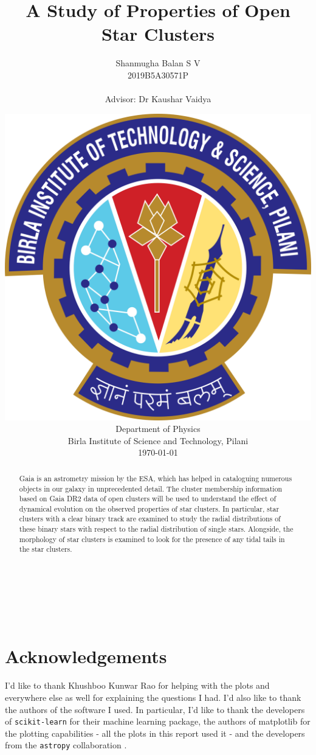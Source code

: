 \documentclass[12pt,a4paper,oneside,openright]{report}
\title{A Study of Properties of Open Star Clusters}
\author{Shanmugha Balan S V \\ 2019B5A30571P \\[1cm]\\{\small Advisor: Dr Kaushar Vaidya}\\[1cm]}
\date{\includegraphics[scale=0.1]{logo} \\ Department of Physics\\ Birla Institute of Science and Technology, Pilani\\[5mm] \today}
\begin{document}
\pagestyle{empty}

\maketitle	
\cleardoublepage

\newpage 
\ %
\newpage

\singlespacing
{}
\pagestyle{plain}
	
\begin{abstract}
Gaia is an astrometry mission by the ESA, which has helped in cataloguing numerous objects in our galaxy in unprecedented detail. The cluster membership information based on Gaia DR2 data of open clusters will be used to understand the effect of dynamical evolution on the observed properties of star clusters. In particular, star clusters with a clear binary track are examined to study the radial distributions of these binary stars with respect to the radial distribution of single stars. Alongside, the morphology of star clusters is examined to look for the presence of any tidal tails in the star clusters. 
\end{abstract}	

\cleardoublepage

\newpage 
\ %
\newpage

\tableofcontents

\cleardoublepage

\pagestyle{fancy}
\singlespacing
{}	





\singlespacing

\chapter*{Acknowledgements}
I'd like to thank Khushboo Kunwar Rao for helping with the plots and everywhere else as well for explaining the questions I had. I'd also like to thank the authors of the software I used. In particular, I'd like to thank the developers of \lstinline{scikit-learn} \citep{scikit-learn} for their machine learning package, the authors of matplotlib for the plotting capabilities - all the plots in this report used it - and the developers from the \lstinline{astropy} collaboration \citep{astropy}.


\nocite{*}
	

	
\end{document}
